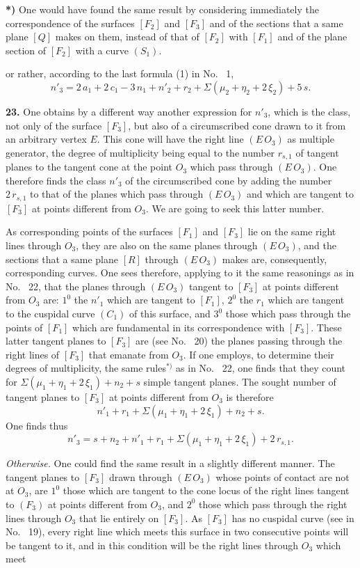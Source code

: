 \documentclass{article}
\begin{document}
\textbf{*)} One would have found the same result by considering immediately the correspondence of the surfaces $[F_2]$ and $[F_3]$ and of the sections that a same plane $[Q]$ makes on them, instead of that of $[F_2]$ with $[F_1]$ and of the plane section of $[F_2]$ with a curve $(S_1)$.

or rather, according to the last formula (1) in No.~ 1,
\[
n'_3 = 2\,a_1 + 2\,c_1 - 3\,n_1 + n'_2 + r_2 + \Sigma(\mu_2 + \eta_2 + 2\,\xi_2) + 5\,s. \tag{$6_c$}
\]

\textbf{23.} One obtains by a different way another expression for $n'_3$, which is the class, not only of the surface $[F_3]$, but also of a circumscribed cone drawn to it from an arbitrary vertex $E$. This cone will have the right line $(E\,O_3)$ as multiple generator, the degree of multiplicity being equal to the number $r_{s, 1}$ of tangent planes to the tangent cone at the point $O_3$ which pass through $(E\,O_3)$. One therefore finds the class $n'_3$ of the circumscribed cone by adding the number $2\,r_{s, 1}$ to that of the planes which pass through $(E\,O_3)$ and which are tangent to $[F_3]$ at points different from $O_3$. We are going to seek this latter number.

As corresponding points of the surfaces $[F_1]$ and $[F_3]$ lie on the same right lines through $O_3$, they are also on the same planes through $(E\,O_3)$, and the sections that a same plane $[R]$ through $(E\,O_3)$ makes are, consequently, corresponding curves. One sees therefore, applying to it the same reasonings as in No.~ 22, that the planes through $(E\,O_3)$ tangent to $[F_3]$ at points different from $O_3$ are: $1^0$ the $n'_1$ which are tangent to $[F_1]$, $2^0$ the $r_1$ which are tangent to the cuspidal curve $(C_1)$ of this surface, and $3^0$ those which pass through the points of $[F_1]$ which are fundamental in its correspondence with $[F_3]$. These latter tangent planes to $[F_3]$ are (see No.~ 20) the planes passing through the right lines of $[F_3]$ that emanate from $O_3$. If one employs, to determine their degrees of multiplicity, the same rules${}^{*)}$ as in No.~ 22, one finds that they count for $\Sigma(\mu_1 + \eta_1 + 2\,\xi_1) + n_2 + s$ simple tangent planes. The sought number of tangent planes to $[F_3]$ at points different from $O_3$ is therefore
\[
n'_1 + r_1 + \Sigma(\mu_1 + \eta_1 + 2\,\xi_1) + n_2 + s.
\]
One finds thus
\[
n'_3 = s + n_2 + n'_1 + r_1 + \Sigma(\mu_1 + \eta_1 + 2\,\xi_1) + 2\,r_{s, 1}. \tag{7}
\]

\emph{Otherwise.} One could find the same result in a slightly different manner. The tangent planes to $[F_3]$ drawn through $(E\,O_3)$ whose points of contact are not at $O_3$, are $1^0$ those which are tangent to the cone locus of the right lines tangent to $(F_3)$ at points different from $O_3$, and $2^0$ those which pass through the right lines through $O_3$ that lie entirely on $[F_3]$. As $[F_3]$ has no cuspidal curve (see in No.~ 19), every right line which meets this surface in two consecutive points will be tangent to it, and in this condition will be the right lines through $O_3$ which meet
\end{document}
